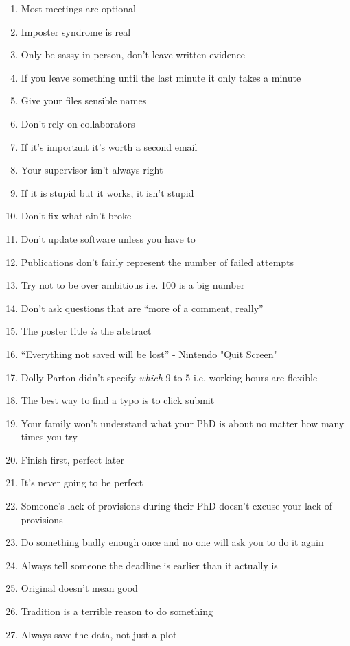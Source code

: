 \begin{enumerate}
	\item Most meetings are optional
	\item Imposter syndrome is real \cite{langford1993}
	\item Only be sassy in person, don't leave written evidence
	\item If you leave something until the last minute it only takes a minute
	\item Give your files sensible names
	\item Don't rely on collaborators
	\item If it's important it's worth a second email
	\item Your supervisor isn't always right
	\item If it is stupid but it works, it isn't stupid
	\item Don't fix what ain't broke
	\item Don't update software unless you have to
	\item Publications don't fairly represent the number of failed attempts
	\item Try not to be over ambitious i.e. 100 is a big number
	\item Don't ask questions that are ``more of a comment, really''
	\item The poster title \emph{is} the abstract
	\item ``Everything not saved will be lost'' - Nintendo "Quit Screen"
	\item Dolly Parton didn't specify \textit{which} 9 to 5 i.e. working hours are flexible
	\item The best way to find a typo is to click submit
	\item Your family won't understand what your PhD is about no matter how many times you try
	\item Finish first, perfect later
	\item It's never going to be perfect
	\item Someone's lack of provisions during their PhD doesn't excuse your lack of provisions
	\item Do something badly enough once and no one will ask you to do it again
	\item Always tell someone the deadline is earlier than it actually is
	\item Original doesn't mean good
	\item Tradition is a terrible reason to do something
	\item Always save the data, not just a plot

\end{enumerate}
